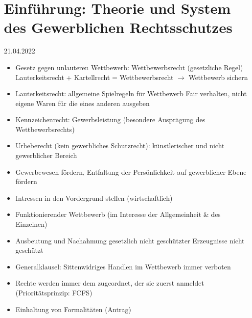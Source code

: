 \documentclass{report}
\begin{document}
\section{Einführung: Theorie und System des Gewerblichen Rechtsschutzes}
21.04.2022
\begin{itemize}
	\item Gesetz gegen unlauteren Wettbewerb: Wettbewerbsrecht (gesetzliche Regel)
	\newline Lauterkeitsrecht + Kartellrecht = Wettbewerbsrecht
	\newline $\rightarrow$ Wettbewerb sichern
	\item Lauterkeitsrecht: allgemeine Spielregeln für Wettbewerb
	\newline Fair verhalten, nicht eigene Waren für die eines anderen ausgeben
	\item Kennzeichenrecht: Gewerbsleistung (besondere Ausprägung des Wettbewerbsrechts)
	\item Urheberecht (kein gewerbliches Schutzrecht): künstlerischer und nicht gewerblicher Bereich
	\item Gewerbewesen fördern, Entfaltung der Persönlichkeit auf gewerblicher Ebene fördern
	\item Intressen in den Vordergrund stellen (wirtschaftlich)
	\item Funktionierender Wettbewerb (im Interesse der Allgemeinheit \& des Einzelnen)
	\item Ausbeutung und Nachahmung gesetzlich nicht geschützter Erzeugnisse nicht geschützt
	\item Generalklausel: Sittenwidriges Handlen im Wettbewerb immer verboten
	\item Rechte werden immer dem zugeordnet, der sie zuerst anmeldet (Prioritätsprinzip: FCFS)
	\item Einhaltung von Formalitäten (Antrag)
\end{itemize}
\end{document}
